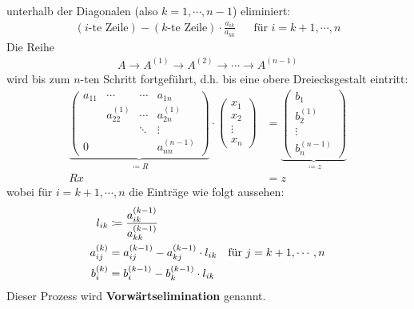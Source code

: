 \documentclass[ngerman,fontsize=11pt, paper=a4, parskip=half, titlepage=true, toc=bib]{scrbook}
\theoremstyle{definition}
\theoremstyle{plain}
\begin{document}
unterhalb der Diagonalen (also $k=1, \cdots, n-1$) eliminiert:
\begin{align*}
  (\text{$i$-te Zeile})- (\text{$k$-te Zeile})\cdot\frac{a_{ik}}{a_{kk}}
  && \text{für } i=k+1, \cdots ,n 
\end{align*}
Die Reihe 
\begin{gather*}
  A \rightarrow A^{(1)} \rightarrow A^{(2)} \rightarrow \dotsm \rightarrow A^{(n-1)}
\end{gather*}
wird bis zum $n$-ten Schritt fortgeführt, d.h. bis eine obere Dreiecksgestalt eintritt:
\begin{align}
  \nonumber
  \underbrace{	\begin{pmatrix}
      a_{11} & \dotsm & \dotsm & a_{1n} \\
      & a_{22}^{(1)} & \dotsm & a_{2n}^{(1)} \\
      &&              \ddots  &  \vdots \\
      0        && &                             a_{nn}^{(n-1)}
    \end{pmatrix}}_{\coloneqq R}
                    \cdot
                    \begin{pmatrix}
                      x_1 \\
                      x_2 \\
                      \vdots \\
                      x_n
                    \end{pmatrix}
             & =
               \underbrace{\begin{pmatrix}
                   b_1 \\
                   b_2^{(1)} \\
                   \vdots \\
                   b_n^{(n-1)}
                 \end{pmatrix}}_{\coloneqq z} \\
  Rx &= z 	\label{II.1.1} 
\end{align}
wobei für  $i=k+1, \cdots ,n$ die Einträge wie folgt aussehen:
\begin{align}	
  l_{ik} &\coloneqq \frac{a_{ik}^{(k-1)}}{a_{kk}^{(k-1)}} \label{II.1.2} \\
  a_{ij}^{(k)} &= a_{ij}^{(k-1)} - a_{kj}^{(k-1)}\cdot l_{ik} \label{II.1.3}
               & \text{für } j=k+1, \cdots , n\\ %
  b_i^{(k)} &= b_i^{(k-1)} -b_k^{(k-1)} \cdot   l_{ik}
              \label{II.1.4}\index{Vorwärtssubstitution}
\end{align}
Dieser Prozess wird \textbf{Vorwärtselimination} genannt.\\
\end{document}
